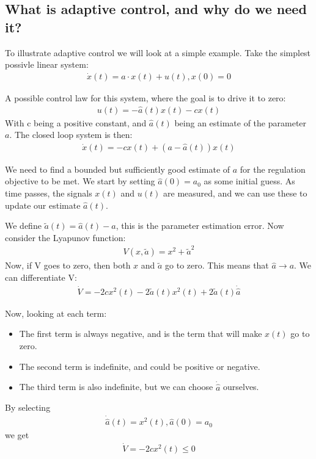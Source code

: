 \subsection*{What is adaptive control, and why do we need it?}
To illustrate adaptive control we will look at a simple example.
Take the simplest possivle linear system:
\begin{align}
    \dot{x}(t) = a \cdot x(t) + u(t), x(0)=0
\end{align}

A possible control law for this system, where the goal is to drive it to zero: 
\begin{align}
    u(t) = -\hat{a}(t)x(t) - cx(t)
\end{align}
With c being a positive constant, and $\hat{a}(t)$ being an estimate of the parameter $a$.
The closed loop system is then:
\begin{align}
    \dot{x}(t) = -cx(t) + (a - \hat{a}(t))x(t)
\end{align}

We need to find a bounded but sufficiently good estimate of $a$ for the regulation 
objective to be met. We start by setting $\hat{a}(0) = a_0$ as some initial guess. As time passes, 
the signals $x(t)$ and $u(t)$ are measured, and we can use these to update our estimate $\hat{a}(t)$.

We define $\tilde{a}(t) = \hat{a}(t) - a$, this is the parameter estimation error. 
Now consider the Lyapunov function:
\begin{align}
    V(x, \tilde{a}) = x^2 + \tilde{a}^2
\end{align}
Now, if V goes to zero, then both $x$ and $\tilde{a}$ go to zero. This means that
$\hat{a} \rightarrow a$. 
We can differentiate V:
\begin{align}
    \dot{V} = -2cx^2 (t) - 2\tilde{a}(t)x^2 (t) + 2\tilde{a}(t)\dot{\hat{a}}
\end{align}

Now, looking at each term: 
\begin{itemize}
    \item The first term is always negative, and is the term that will make $x(t)$ go to zero. 
    \item The second term is indefinite, and could be positive or negative. 
    \item The third term is also indefinite, but we can choose $\dot{\hat{a}}$ ourselves.
\end{itemize}

By selecting 
\begin{align}
    \dot{\hat{a}}(t) = x^2 (t), \hat{a}(0) = a_0
\end{align}
we get
\begin{align}
    \dot{V} = -2cx^2 (t) \leq 0
\end{align}

